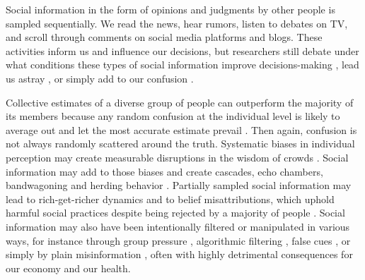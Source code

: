 \documentclass[9pt,a4paper,twocolumn,lineno]{article}
\begin{document}
%

Social information in the form of opinions and judgments by other people is sampled sequentially. We read the news, hear rumors, listen to debates on TV, and scroll through comments on social media platforms and blogs. These activities inform us and influence our decisions, but researchers still debate under what conditions these types of social information improve decisions-making \cite{woolley2010evidence, gurccay2015power, becker2017network, jayles2017social}, lead us astray \cite{caplan2011myth, lorenz2011social, minson2012cost, king2011true, le2018endogenous}, or simply add to our confusion \cite{salganik2006experimental, salganik2009web}.

Collective estimates of a diverse group of people can outperform the majority of its members because any random confusion at the individual level is likely to average out and let the most accurate estimate prevail \cite{galton1907vox, muth1961rational, surowiecki2005wisdom, hong2008some}. Then again, confusion is not always randomly scattered around the truth. Systematic biases in individual perception may create measurable disruptions in the wisdom of crowds \cite{izard2008calibrating, nash2014curious, kao2018counteracting}. Social information may add to those biases and create cascades, echo chambers, bandwagoning and herding behavior \cite{anderson1997information, bikhchandani1992theory, bakshy2015exposure, banerjee1992simple}. Partially sampled social information may lead to rich-get-richer dynamics \cite{barabasi1999emergence} and to belief misattributions, which uphold harmful social practices despite being rejected by a majority of people \cite{katz1931students, darley1968bystander, ross1977false, noelle1974spiral, lee2019homophily}. Social information may also have been intentionally filtered or manipulated in various ways, for instance through group pressure \cite{asch1951effects}, algorithmic filtering \cite{pariser2011filter}, false cues \cite{salganik2006experimental, muchnik2013social, hanson1996hits}, or simply by plain misinformation \cite{hendricks2018reality}, often with highly detrimental consequences for our economy and our health.
\end{document}
